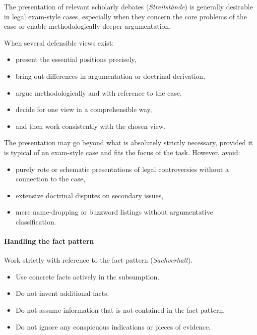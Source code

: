 \documentclass[11pt]{article}
\providecommand{\tightlist}{%
  \setlength{\itemsep}{0pt}\setlength{\parskip}{0pt}}
\begin{document}
The presentation of relevant scholarly debates (\emph{Streitstände}) is
generally desirable in legal exam-style cases, especially when they
concern the core problems of the case or enable methodologically deeper
argumentation.

When several defensible views exist:

\begin{itemize}
\tightlist
\item
  present the essential positions precisely,
\item
  bring out differences in argumentation or doctrinal derivation,
\item
  argue methodologically and with reference to the case,
\item
  decide for one view in a comprehensible way,
\item
  and then work consistently with the chosen view.
\end{itemize}

The presentation may go beyond what is absolutely strictly necessary,
provided it is typical of an exam-style case and fits the focus of the
task. However, avoid:

\begin{itemize}
\tightlist
\item
  purely rote or schematic presentations of legal controversies without
  a connection to the case,
\item
  extensive doctrinal disputes on secondary issues,
\item
  mere name-dropping or buzzword listings without argumentative
  classification.
\end{itemize}

\paragraph{\texorpdfstring{\textbf{Handling the fact
pattern}}{Handling the fact pattern}}\label{handling-the-fact-pattern}

Work strictly with reference to the fact pattern (\emph{Sachverhalt}).

\begin{itemize}
\tightlist
\item
  Use concrete facts actively in the subsumption.
\item
  Do not invent additional facts.
\item
  Do not assume information that is not contained in the fact pattern.
\item
  Do not ignore any conspicuous indications or pieces of evidence.
\end{itemize}
\end{document}
